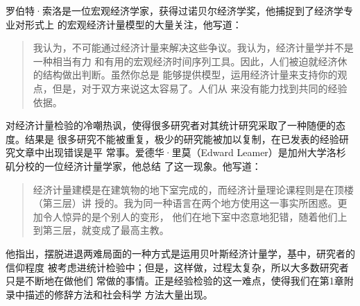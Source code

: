 罗伯特·索洛是一位宏观经济学家，获得过诺贝尔经济学奖，他捕捉到了经济学专业对形式上
的宏观经济计量模型的大量关注，他写道：

\begin{quotation}
  我认为，不可能通过经济计量来解决这些争议。我认为，经济计量学并不是一种相当有力
  和有用的宏观经济时间序列工具。因此，人们被迫就经济休的结构做出判断。虽然你总是
  能够提供模型，运用经济计量来支持你的观点，但是，对于双方来说这太容易了。人们从
  来没有能力找到共同的经验依据。
\end{quotation}

对经济计量检验的冷嘲热讽，使得很多研究者对其统计研究采取了一种随便的态度。结果是
很多研究不能被重复，极少的研究能被加以复制，在已发表的经验研究文章中出现错误是平
常事。爱德华·里莫（Edward Leamer）是加州大学洛杉矶分校的一位经济计量学家，他总结
了这一现象。他写道：

\begin{quotation}
  经济计量建模是在建筑物的地下室完成的，而经济计量理论课程则是在顶楼（第三层）讲
  授的。我为同一种语言在两个地方使用这一事实所困惑。更加令人惊异的是个别人的变形，
  他们在地下室中恣意地犯错，随着他们上到第三层，就变成了最高主教。
\end{quotation}

他指出，摆脱进退两难局面的一种方式是运用贝叶斯经济计量学，基中，研究者的信仰程度
被考虑进统计检验中；但是，这样做，过程太复杂，所以大多数研究者只是不断地在做他们
常做的事情。正是经验检验的这一难点，使得我们在第1章附录中描述的修辞方法和社会科学
方法大量出现。

